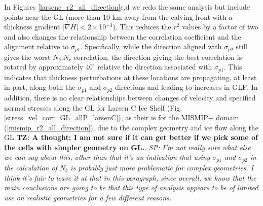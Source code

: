 \documentclass[review,oneside]{igs}
\begin{document}
In Figures \ref{larsenc_r2_all_direction}c,d we redo the same analysis but include points near the GL (more than 10 km away from the calving front with a thickness gradient $\left|\nabla H\right|< 2 \times$10$^{-3}$). This reduces the $r^2$ values by a factor of two and also changes the relationship between the correlation coefficient and the alignment relative to $\sigma_{p1}$. Specifically, while the direction aligned with $\sigma_{p2}$ still gives the worst $N_b$:$N_r$ correlation, the direction giving the best correlation is rotated by approximately $40^\circ$ relative the direction associated with $\sigma_{p1}$. This indicates that thickness perturbations at these locations are propagating, at least in part, along both the $\sigma_{p1}$ and $\sigma_{p2}$ directions and leading to increases in GLF. In addition, there is no clear relationships between changes of velocity and specified normal stresses along the GL for Larsen C Ice Shelf (Fig.  \ref{stress_vel_corr_GL_allP_larsenC}), as their is for the MISMIP+ domain (\ref{mismip_r2_all_direction}), due to the complex geometry and ice flow along the GL \textbf{TZ: A thought: I am not sure if it can get better if we pick some of the cells with simpler geometry on GL.}. \textit{SP: I'm not really sure what else we can say about this, other than that it's an indication that using $\sigma_{p1}$ and $\sigma_{p2}$ in the calculation of $N_b$ is probably just more problematic for complex geometries. I think it's fair to leave it at that in this paragraph, since overall, we know that the main conclusions are going to be that this type of analysis appears to be of limited use on realistic geometries for a few different reasons.} 
\end{document}
